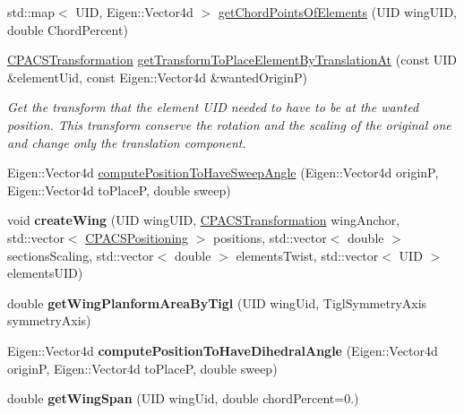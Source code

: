 \begin{DoxyCompactItemize}
std\-::map$<$ U\-I\-D, Eigen\-::\-Vector4d $>$ \hyperlink{classcpcr_1_1AircraftTree_a80bb2d4e67b22e7beeaca5f9a38571d3}{get\-Chord\-Points\-Of\-Elements} (U\-I\-D wing\-U\-I\-D, double Chord\-Percent)
\item 
\hyperlink{classcpcr_1_1CPACSTransformation}{C\-P\-A\-C\-S\-Transformation} \hyperlink{classcpcr_1_1AircraftTree_a354078d68acb6d647f4a373132f807f0}{get\-Transform\-To\-Place\-Element\-By\-Translation\-At} (const U\-I\-D \&element\-Uid, const Eigen\-::\-Vector4d \&wanted\-Origin\-P)
\begin{DoxyCompactList}\small\item\em Get the transform that the element U\-I\-D needed to have to be at the wanted position. This transform conserve the rotation and the scaling of the original one and change only the translation component. \end{DoxyCompactList}\item 
Eigen\-::\-Vector4d \hyperlink{classcpcr_1_1AircraftTree_a0888c4baf7f40e1f29003a73d81f0ae3}{compute\-Position\-To\-Have\-Sweep\-Angle} (Eigen\-::\-Vector4d origin\-P, Eigen\-::\-Vector4d to\-Place\-P, double sweep)
\item 
\hypertarget{classcpcr_1_1AircraftTree_aa6ae916d24a2efc9aa07be61b7802c80}{void {\bfseries create\-Wing} (U\-I\-D wing\-U\-I\-D, \hyperlink{classcpcr_1_1CPACSTransformation}{C\-P\-A\-C\-S\-Transformation} wing\-Anchor, std\-::vector$<$ \hyperlink{classcpcr_1_1CPACSPositioning}{C\-P\-A\-C\-S\-Positioning} $>$ positions, std\-::vector$<$ double $>$ sections\-Scaling, std\-::vector$<$ double $>$ elements\-Twist, std\-::vector$<$ U\-I\-D $>$ elements\-U\-I\-D)}\label{classcpcr_1_1AircraftTree_aa6ae916d24a2efc9aa07be61b7802c80}

\item 
\hypertarget{classcpcr_1_1AircraftTree_a9f109852b43b90a6e1db62be03109299}{double {\bfseries get\-Wing\-Planform\-Area\-By\-Tigl} (U\-I\-D wing\-Uid, Tigl\-Symmetry\-Axis symmetry\-Axis)}\label{classcpcr_1_1AircraftTree_a9f109852b43b90a6e1db62be03109299}

\item 
\hypertarget{classcpcr_1_1AircraftTree_ac00870b80a2edf024d923f82f9689e75}{Eigen\-::\-Vector4d {\bfseries compute\-Position\-To\-Have\-Dihedral\-Angle} (Eigen\-::\-Vector4d origin\-P, Eigen\-::\-Vector4d to\-Place\-P, double sweep)}\label{classcpcr_1_1AircraftTree_ac00870b80a2edf024d923f82f9689e75}

\item 
\hypertarget{classcpcr_1_1AircraftTree_abf7c650b9b2ee32eef65067de28a4bb3}{double {\bfseries get\-Wing\-Span} (U\-I\-D wing\-Uid, double chord\-Percent=0.)}\label{classcpcr_1_1AircraftTree_abf7c650b9b2ee32eef65067de28a4bb3}


\end{DoxyCompactItemize}
